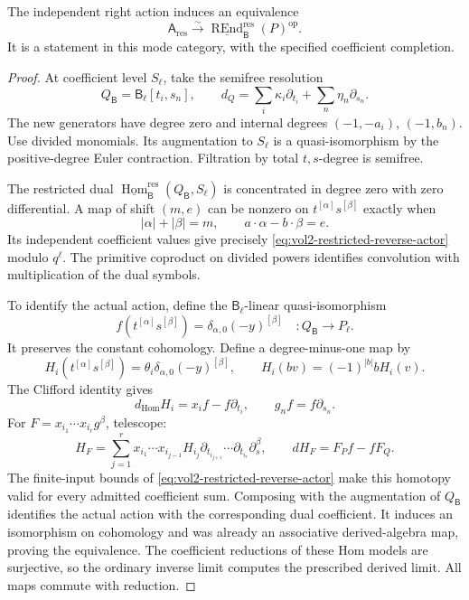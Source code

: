 \begin{proposition}\label{prop:vol2-reverse-mode-equivalence}
The independent right action induces an equivalence
\[
 \mathsf A_{\mathrm{res}}
 \xrightarrow{\sim}
 \underline{\operatorname{REnd}}_{\mathsf B}^{\mathrm{res}}
                                      (P)^{\mathrm{op}}.
\]
It is a statement in this mode category, with the specified
coefficient completion.
\end{proposition}
\begin{proof}
At coefficient level \(S_\ell\), take the semifree resolution
\[
 Q_{\mathsf B}=\mathsf B_\ell[t_i,s_n],\qquad
 d_Q=\sum_i\kappa_i\partial_{t_i}
                         +\sum_n\eta_n\partial_{s_n}.
\]
The new generators have degree zero and internal degrees
\((-1,-a_i)\), \((-1,b_n)\). Use divided monomials.
Its augmentation to \(S_\ell\) is a quasi-isomorphism by
the positive-degree Euler contraction. Filtration by total
\(t,s\)-degree is semifree.

The restricted dual
\(\underline{\operatorname{Hom}}_{\mathsf B}^{\mathrm{res}}
(Q_{\mathsf B},S_\ell)\) is concentrated in degree zero
with zero differential. A map of shift \((m,e)\) can be
nonzero on \(t^{[\alpha]}s^{[\beta]}\) exactly when
\[
 |\alpha|+|\beta|=m,\qquad a\cdot\alpha-b\cdot\beta=e.
\]
Its independent coefficient values give precisely
\eqref{eq:vol2-restricted-reverse-actor} modulo \(q^\ell\).
The primitive coproduct on divided powers identifies
convolution with multiplication of the dual symbols.

To identify the actual action, define the
\(\mathsf B_\ell\)-linear quasi-isomorphism
\[
 f(t^{[\alpha]}s^{[\beta]})
       =\delta_{\alpha,0}(-y)^{[\beta]}
       \quad:Q_{\mathsf B}\longrightarrow P_\ell.
\]
It preserves the constant cohomology. Define a degree-minus-one
map by
\[
 H_i(t^{[\alpha]}s^{[\beta]})
       =\theta_i\delta_{\alpha,0}(-y)^{[\beta]},
 \qquad H_i(bv)=(-1)^{|b|}bH_i(v).
\]
The Clifford identity gives
\[
 d_{\operatorname{Hom}}H_i=x_if-f\partial_{t_i},
 \qquad g_nf=f\partial_{s_n}.
\]
For \(F=x_{i_1}\cdots x_{i_r}g^\beta\), telescope:
\[
 H_F=\sum_{j=1}^r x_{i_1}\cdots x_{i_{j-1}}
 H_{i_j}\partial_{t_{i_{j+1}}}\cdots
             \partial_{t_{i_r}}\partial_s^\beta,
 \qquad dH_F=F_Pf-fF_Q.
\]
The finite-input bounds of
\eqref{eq:vol2-restricted-reverse-actor} make this homotopy
valid for every admitted coefficient sum. Composing with
the augmentation of \(Q_{\mathsf B}\) identifies the actual
action with the corresponding dual coefficient. It induces
an isomorphism on cohomology and was already an associative
derived-algebra map, proving the equivalence.
The coefficient reductions of these Hom models are
surjective, so the ordinary inverse limit computes the
prescribed derived limit. All maps commute with reduction.
\end{proof}

